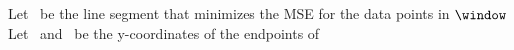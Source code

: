 


\beginAlgorithm
{}
Let \segment\ be the line segment that minimizes the MSE for the data points in $\window$\\
Let \sO\ and \sN\ be the y-coordinates of the endpoints of \segment\\
\encodeWindowSizee\\
\codeFloat{\sO}\\
\codeFloat{\sN}
